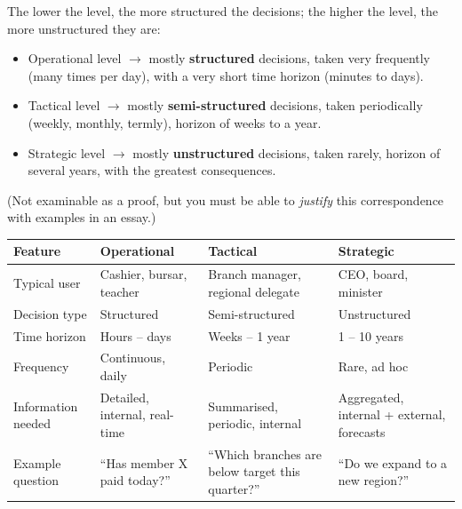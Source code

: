 \documentclass[11pt]{article}
\newcommand{\cle}[1]{{\popxbold\color{popdark}#1}}
\begin{document}
\begin{propriete}
The lower the level, the more \cle{structured} the decisions; the higher the level, the more \cle{unstructured} they are:
\begin{itemize}
\item Operational level $\rightarrow$ mostly \textbf{structured} decisions, taken very frequently (many times per day), with a very short time horizon (minutes to days).
\item Tactical level $\rightarrow$ mostly \textbf{semi-structured} decisions, taken periodically (weekly, monthly, termly), horizon of weeks to a year.
\item Strategic level $\rightarrow$ mostly \textbf{unstructured} decisions, taken rarely, horizon of several years, with the greatest consequences.
\end{itemize}
(Not examinable as a proof, but you must be able to \emph{justify} this correspondence with examples in an essay.)
\end{propriete}

\begin{center}
\begin{tabularx}{\linewidth}{|l|X|X|X|}
\hline
\rowcolor{popblueL} \textbf{Feature} & \textbf{Operational} & \textbf{Tactical} & \textbf{Strategic} \\
\hline
Typical user & Cashier, bursar, teacher & Branch manager, regional delegate & CEO, board, minister \\
\hline
Decision type & Structured & Semi-structured & Unstructured \\
\hline
Time horizon & Hours -- days & Weeks -- 1 year & 1 -- 10 years \\
\hline
Frequency & Continuous, daily & Periodic & Rare, ad hoc \\
\hline
Information needed & Detailed, internal, real-time & Summarised, periodic, internal & Aggregated, internal + external, forecasts \\
\hline
Example question & ``Has member X paid today?'' & ``Which branches are below target this quarter?'' & ``Do we expand to a new region?'' \\
\hline
\end{tabularx}
\end{center}
\end{document}
